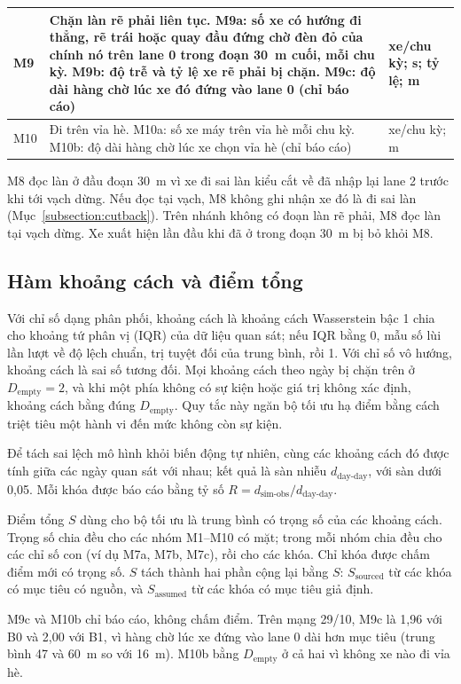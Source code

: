\documentclass[../main.tex]{subfiles}
\begin{document}
\begin{table}[ht]
\begin{tabular}{|p{1.0cm}|p{9.0cm}|p{3.2cm}|}
M9 & Chặn làn rẽ phải liên tục. M9a: số xe có hướng đi thẳng, rẽ trái hoặc quay đầu đứng chờ đèn đỏ của chính nó trên lane 0 trong đoạn 30~m cuối, mỗi chu kỳ. M9b: độ trễ và tỷ lệ xe rẽ phải bị chặn. M9c: độ dài hàng chờ lúc xe đó đứng vào lane 0 (chỉ báo cáo) & xe/chu kỳ; s; tỷ lệ; m \\ \hline
M10 & Đi trên vỉa hè. M10a: số xe máy trên vỉa hè mỗi chu kỳ. M10b: độ dài hàng chờ lúc xe chọn vỉa hè (chỉ báo cáo) & xe/chu kỳ; m \\ \hline
\end{tabular}
\end{table}

M8 đọc làn ở đầu đoạn 30~m vì xe đi sai làn kiểu cắt về đã nhập lại lane 2 trước khi tới vạch dừng. Nếu đọc tại vạch, M8 không ghi nhận xe đó là đi sai làn (Mục~\ref{subsection:cutback}). Trên nhánh không có đoạn làn rẽ phải, M8 đọc làn tại vạch dừng. Xe xuất hiện lần đầu khi đã ở trong đoạn 30~m bị bỏ khỏi M8.

\subsection{Hàm khoảng cách và điểm tổng}

Với chỉ số dạng phân phối, khoảng cách là khoảng cách Wasserstein bậc 1 chia cho khoảng tứ phân vị (IQR) của dữ liệu quan sát; nếu IQR bằng 0, mẫu số lùi lần lượt về độ lệch chuẩn, trị tuyệt đối của trung bình, rồi 1. Với chỉ số vô hướng, khoảng cách là sai số tương đối. Mọi khoảng cách theo ngày bị chặn trên ở $D_{\text{empty}} = 2$, và khi một phía không có sự kiện hoặc giá trị không xác định, khoảng cách bằng đúng $D_{\text{empty}}$. Quy tắc này ngăn bộ tối ưu hạ điểm bằng cách triệt tiêu một hành vi đến mức không còn sự kiện.

Để tách sai lệch mô hình khỏi biến động tự nhiên, cùng các khoảng cách đó được tính giữa các ngày quan sát với nhau; kết quả là sàn nhiễu $d_{\text{day-day}}$, với sàn dưới 0,05. Mỗi khóa được báo cáo bằng tỷ số $R = d_{\text{sim-obs}}/d_{\text{day-day}}$.

Điểm tổng $S$ dùng cho bộ tối ưu là trung bình có trọng số của các khoảng cách. Trọng số chia đều cho các nhóm M1--M10 có mặt; trong mỗi nhóm chia đều cho các chỉ số con (ví dụ M7a, M7b, M7c), rồi cho các khóa. Chỉ khóa được chấm điểm mới có trọng số. $S$ tách thành hai phần cộng lại bằng $S$: $S_{\text{sourced}}$ từ các khóa có mục tiêu có nguồn, và $S_{\text{assumed}}$ từ các khóa có mục tiêu giả định.

M9c và M10b chỉ báo cáo, không chấm điểm. Trên mạng 29/10, M9c là 1,96 với B0 và 2,00 với B1, vì hàng chờ lúc xe đứng vào lane 0 dài hơn mục tiêu (trung bình 47 và 60~m so với 16~m). M10b bằng $D_{\text{empty}}$ ở cả hai vì không xe nào đi vỉa hè.
\end{document}
